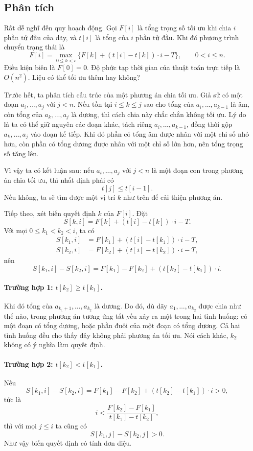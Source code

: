 \documentclass[11pt]{article}
\begin{document}
\subsection*{Phân tích}

Rất dễ nghĩ đến quy hoạch động. Gọi $F[i]$ là tổng trọng số tối ưu khi chia
$i$ phần tử đầu của dãy, và $t[i]$ là tổng của $i$ phần tử đầu. Khi đó phương
trình chuyển trạng thái là
\[
  F[i]=\max_{0\le k<i}\{F[k]+(t[i]-t[k])\cdot i-T\},
  \qquad 0<i\le n.
\]
Điều kiện biên là $F[0]=0$. Độ phức tạp thời gian của thuật toán trực tiếp là
$O(n^2)$. Liệu có thể tối ưu thêm hay không?

Trước hết, ta phân tích cấu trúc của một phương án chia tối ưu. Giả sử có một
đoạn $a_i,\ldots,a_j$ với $j<n$. Nếu tồn tại $i\le k\le j$ sao cho tổng của
$a_i,\ldots,a_{k-1}$ là âm, còn tổng của $a_k,\ldots,a_j$ là dương, thì cách
chia này chắc chắn không tối ưu. Lý do là ta có thể giữ nguyên các đoạn khác,
tách riêng $a_i,\ldots,a_{k-1}$, đồng thời gộp $a_k,\ldots,a_j$ vào đoạn kế
tiếp. Khi đó phần có tổng âm được nhân với một chỉ số nhỏ hơn, còn phần có
tổng dương được nhân với một chỉ số lớn hơn, nên tổng trọng số tăng lên.

Vì vậy ta có kết luận sau: nếu $a_i,\ldots,a_j$ với $j<n$ là một đoạn con
trong phương án chia tối ưu, thì nhất định phải có
\[
  t[j]\le t[i-1].
\]
Nếu không, ta sẽ tìm được một vị trí $k$ như trên để cải thiện phương án.

Tiếp theo, xét biến quyết định $k$ của $F[i]$. Đặt
\[
  S[k,i]=F[k]+(t[i]-t[k])\cdot i-T.
\]
Với mọi $0\le k_1<k_2<i$, ta có
\[
\begin{aligned}
  S[k_1,i]&=F[k_1]+(t[i]-t[k_1])\cdot i-T,\\
  S[k_2,i]&=F[k_2]+(t[i]-t[k_2])\cdot i-T,
\end{aligned}
\]
nên
\[
  S[k_1,i]-S[k_2,i]
  =F[k_1]-F[k_2]+(t[k_2]-t[k_1])\cdot i.
\]

\paragraph{Trường hợp 1: $t[k_2]\ge t[k_1]$.}
Khi đó tổng của $a_{k_1+1},\ldots,a_{k_2}$ là dương. Do đó, dù dãy
$a_1,\ldots,a_{k_2}$ được chia như thế nào, trong phương án tương ứng tất yếu
xảy ra một trong hai tình huống: có một đoạn có tổng dương, hoặc phần đuôi
của một đoạn có tổng dương. Cả hai tình huống đều cho thấy đây không phải
phương án tối ưu. Nói cách khác, $k_2$ không có ý nghĩa làm quyết định.

\paragraph{Trường hợp 2: $t[k_2]<t[k_1]$.}
Nếu
\[
  S[k_1,i]-S[k_2,i]
  =F[k_1]-F[k_2]+(t[k_2]-t[k_1])\cdot i>0,
\]
tức là
\[
  i<\frac{F[k_2]-F[k_1]}{t[k_1]-t[k_2]},
\]
thì với mọi $j\le i$ ta cũng có
\[
  S[k_1,j]-S[k_2,j]>0.
\]
Như vậy biến quyết định có tính đơn điệu.
\end{document}
